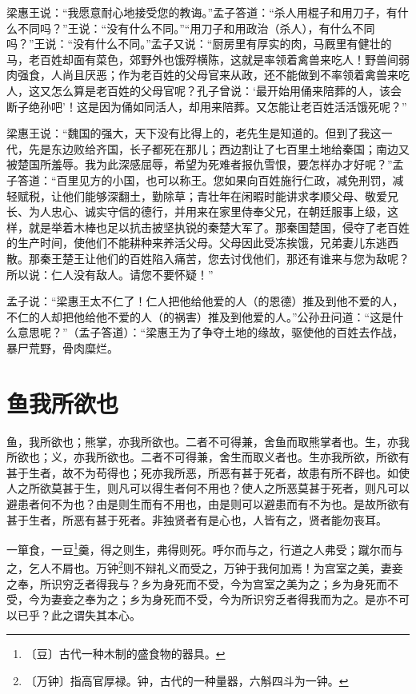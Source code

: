 \documentclass[12pt,UTF-8,openany]{ctexbook}
\begin{document}
\begin{normalsize}
    梁惠王说：“我愿意耐心地接受您的教诲。”孟子答道：“杀人用棍子和用刀子，有什么不同吗？”王说：“没有什么不同。”“用刀子和用政治（杀人），有什么不同吗？”王说：“没有什么不同。”孟子又说：“厨房里有厚实的肉，马厩里有健壮的马，老百姓却面有菜色，郊野外也饿殍横陈，这就是率领着禽兽来吃人！野兽间弱肉强食，人尚且厌恶；作为老百姓的父母官来从政，还不能做到不率领着禽兽来吃人，这又怎么算是老百姓的父母官呢？孔子曾说：‘最开始用俑来陪葬的人，该会断子绝孙吧’！这是因为俑如同活人，却用来陪葬。又怎能让老百姓活活饿死呢？”
    
    梁惠王说：“魏国的强大，天下没有比得上的，老先生是知道的。但到了我这一代，先是东边败给齐国，长子都死在那儿；西边割让了七百里土地给秦国；南边又被楚国所羞辱。我为此深感屈辱，希望为死难者报仇雪恨，要怎样办才好呢？”孟子答道：“百里见方的小国，也可以称王。您如果向百姓施行仁政，减免刑罚，减轻赋税，让他们能够深翻土，勤除草；青壮年在闲暇时能讲求孝顺父母、敬爱兄长、为人忠心、诚实守信的德行，并用来在家里侍奉父兄，在朝廷服事上级，这样，就是举着木棒也足以抗击披坚执锐的秦楚大军了。那秦国楚国，侵夺了老百姓的生产时间，使他们不能耕种来养活父母。父母因此受冻挨饿，兄弟妻儿东逃西散。那秦王楚王让他们的百姓陷入痛苦，您去讨伐他们，那还有谁来与您为敌呢？所以说：仁人没有敌人。请您不要怀疑！”
    
    孟子说：“梁惠王太不仁了！仁人把他给他爱的人（的恩德）推及到他不爱的人，不仁的人却把他给他不爱的人（的祸害）推及到他爱的人。”公孙丑问道：“这是什么意思呢？”（孟子答道）：“梁惠王为了争夺土地的缘故，驱使他的百姓去作战，暴尸荒野，骨肉糜烂。
    
\end{normalsize}



\chapter{鱼我所欲也}

\begin{normalsize}
    
    鱼，我所欲也；熊掌，亦我所欲也。二者不可得兼，舍鱼而取熊掌者也。生，亦我所欲也；义，亦我所欲也。二者不可得兼，舍生而取义者也。生亦我所欲，所欲有甚于生者，故不为苟得也；死亦我所恶，所恶有甚于死者，故患有所不辟也。如使人之所欲莫甚于生，则凡可以得生者何不用也？使人之所恶莫甚于死者，则凡可以避患者何不为也？由是则生而有不用也，由是则可以避患而有不为也。是故所欲有甚于生者，所恶有甚于死者。非独贤者有是心也，人皆有之，贤者能勿丧耳。
    
    一箪食，一豆\footnote{〔豆〕古代一种木制的盛食物的器具。}羹，得之则生，弗得则死。呼尔而与之，行道之人弗受；蹴尔而与之，乞人不屑也。万钟\footnote{〔万钟〕指高官厚禄。钟，古代的一种量器，六斛四斗为一钟。}则不辩礼义而受之，万钟于我何加焉！为宫室之美，妻妾之奉，所识穷乏者得我与？乡为身死而不受，今为宫室之美为之；乡为身死而不受，今为妻妾之奉为之；乡为身死而不受，今为所识穷乏者得我而为之。是亦不可以已乎？此之谓失其本心。
\end{normalsize}
\end{document}
